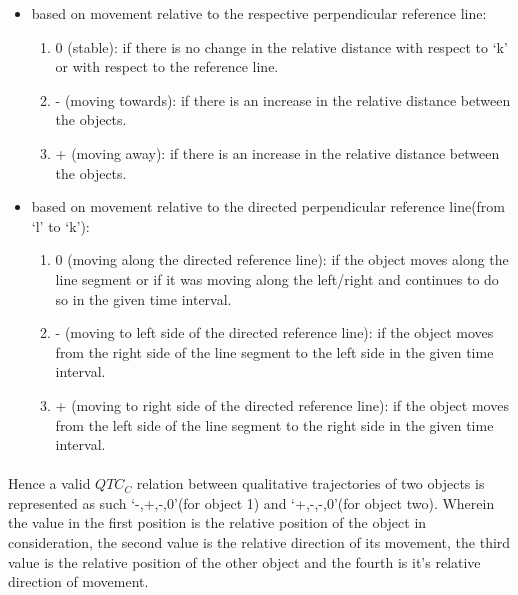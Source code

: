 	\begin{itemize}
		\item based on movement relative to the respective perpendicular reference line:
		
		\begin{enumerate}
			\item 0 (stable): if there is no change in the relative distance with respect to `k' or with respect to the reference line. 
			
			\item - (moving towards): if there is an increase in the relative distance between the objects.
			
			\item + (moving away): if there is an increase in the relative distance between the objects.
		\end{enumerate}
	
		\item  based on movement relative to the directed perpendicular reference line(from `l' to `k'):
		
		\begin{enumerate}
			\item 0 (moving along the directed reference line): if the object moves
			along the line segment or if it was moving along the left/right and continues to do so in the given time interval.
			
			\item - (moving to left side of the directed reference line): if the object moves from the right side of the line segment to the left side in the given time interval.
			
			\item + (moving to right side of the directed reference line): if the object moves from the left side of the line segment to the right side in the given time interval.
		\end{enumerate}
	
	\end{itemize}

	\paragraph{}Hence a valid $QTC_C$ relation between qualitative trajectories of two objects is represented as such `{-,+,-,0}'(for object 1) and `{+,-,-,0}'(for object two). Wherein the value in the first position is the relative position of the object in consideration, the second value is the relative direction of its movement, the third value is the relative position of the other object and the fourth is it's relative direction of movement.
	
